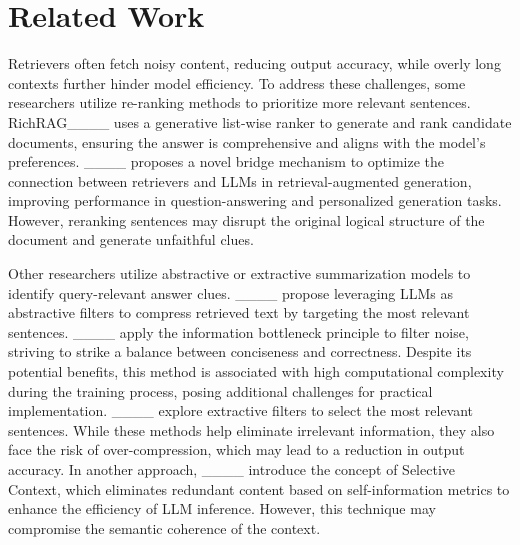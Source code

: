 \section{Related Work}
Retrievers often fetch noisy content, reducing output accuracy, while overly long contexts further hinder model efficiency. To address these challenges, some researchers utilize re-ranking methods to prioritize more relevant sentences. 
RichRAG____ uses a generative list-wise ranker to generate and rank candidate documents, ensuring the answer is comprehensive and aligns with the model’s preferences. ____ proposes a novel bridge mechanism to optimize the connection between retrievers and LLMs in retrieval-augmented generation, improving performance in question-answering and personalized generation tasks.
However, reranking sentences may disrupt the original logical structure of the document and generate unfaithful clues.


Other researchers utilize abstractive or extractive summarization models to identify query-relevant answer clues. ____ propose leveraging LLMs as abstractive filters to compress retrieved text by targeting the most relevant sentences. ____ apply the information bottleneck principle to filter noise, striving to strike a balance between conciseness and correctness. Despite its potential benefits, this method is associated with high computational complexity during the training process, posing additional challenges for practical implementation. ____ explore extractive filters to select the most relevant sentences. While these methods help eliminate irrelevant information, they also face the risk of over-compression, which may lead to a reduction in output accuracy.  In another approach, ____ introduce the concept of Selective Context, which eliminates redundant content based on self-information metrics to enhance the efficiency of LLM inference. However, this technique may compromise the semantic coherence of the context.